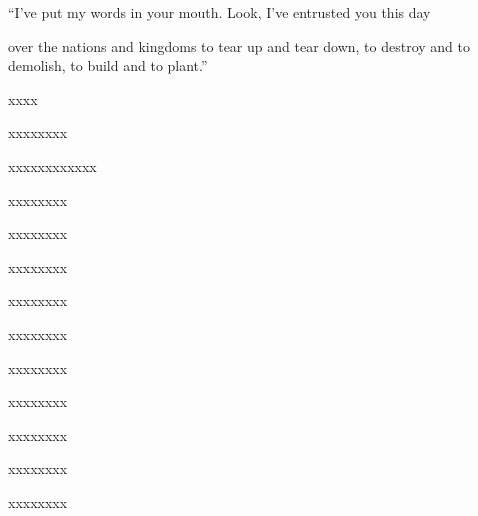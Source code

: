 \begin{inparaenum}
  \pb{}``I've put my words in your mouth.\pa{} Look, I've entrusted you this day%

  \pa{}over the nations and kingdoms to tear up and tear down, to destroy and to demolish, to build and to plant.''\smallskip%


   xxxx\smallskip%

  \pb{}xxxx\pa{}xxxx%

  \pa{} xxxx\pa{}xxxx\pa{}xxxx%

  \pb{}xxxx\pa{}xxxx%

  \pb{}xxxx\pa{}xxxx%

  \pa{} xxxx\pa{}xxxx%

  \pb{}xxxx\pa{}xxxx%

  \pb{} xxxx\pa{}xxxx%

  \pa{}xxxx\pa{}xxxx%

  \pa{} xxxx\pa{}xxxx%

  \pb{}xxxx\pa{}xxxx%

  \pb{}xxxx\pa{}xxxx%

  \pa{} xxxx\pa{}xxxx%
\end{inparaenum}
